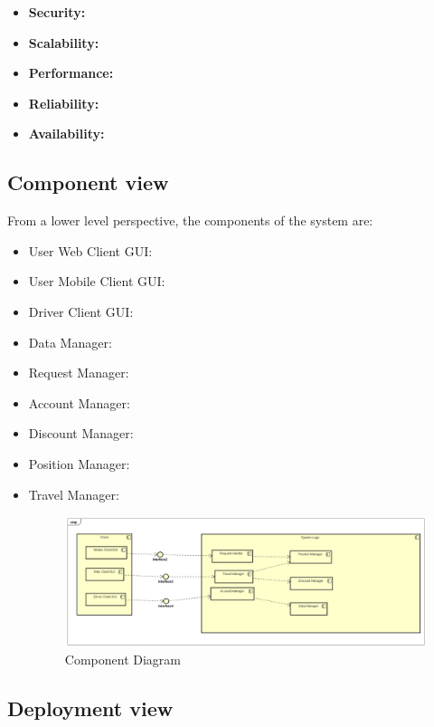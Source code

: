 \begin{itemize}
\item {\textbf{Security:}}
\item {\textbf{Scalability:}}
\item {\textbf{Performance:}}
\item {\textbf{Reliability:}}
\item {\textbf{Availability:}}
\end{itemize}



\subsection{Component view} 
From a lower level perspective, the components of the system are:

\begin{itemize}
\item User Web Client GUI:
\item User Mobile Client GUI:
\item Driver Client GUI:
\item Data Manager:
\item Request Manager:
\item Account Manager:
\item Discount Manager:
\item Position Manager:
\item Travel Manager:

	\begin{figure}[H]	
	\centering
	\includegraphics[scale=0.5]{img/Component_Diagram}
	\caption{Component Diagram}
	
	
\end{figure}

\end{itemize}


\subsection{Deployment view}
